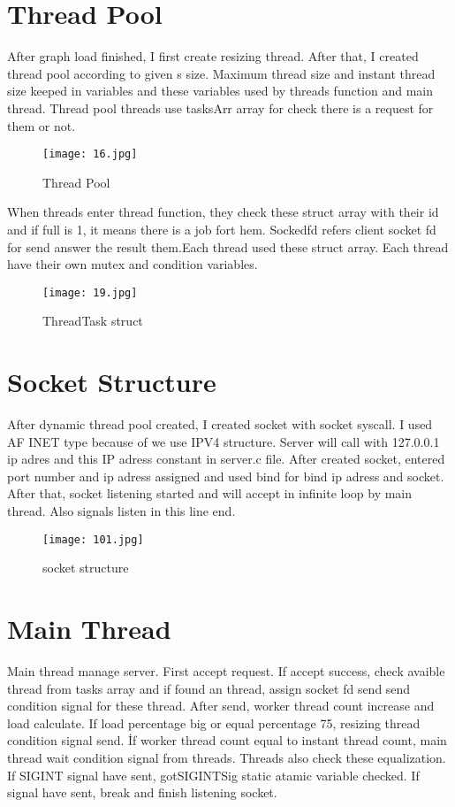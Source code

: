 \documentclass{article}
\begin{document}
\section{Thread Pool}
After graph load finished, I first create resizing thread. After that, I created thread pool according to given s size. Maximum thread size and instant thread size keeped in variables and these variables used by threads function and main thread. Thread pool threads use tasksArr array for check there is a request for them or not.
\newpage
\begin{figure}[h!] 
    \centering
    \texttt{[image: 16.jpg]}
    \caption{Thread Pool}
\end{figure}
When threads enter thread function, they check these struct array with their id and if full is 1, it means there is a job fort hem. Sockedfd refers client socket fd for send answer the result them.Each thread used these struct array. Each thread have their own mutex and condition variables.
\begin{figure}[h!] 
    \centering
    \texttt{[image: 19.jpg]}
    \caption{ThreadTask struct}
\end{figure}



\section{Socket Structure}
After dynamic thread pool created, I created socket with socket syscall. I used AF INET type because of we use IPV4 structure. Server will call with  127.0.0.1  ip adres and this IP adress constant in server.c file. After created socket, entered port number and ip adress assigned and  used bind for bind ip adress and socket.  After that, socket listening started and will accept in infinite loop by main thread. Also signals listen in this line end.
\begin{figure}[h!] 
    \centering
    \texttt{[image: 101.jpg]}
    \caption{socket structure}
\end{figure}

\section{Main Thread}
Main thread manage server. First accept request. If accept success, check avaible thread from tasks array and if found an thread, assign socket fd send send condition signal for these thread. After send, worker thread count increase and load calculate. If load percentage big or equal percentage 75, resizing thread condition signal send. İf worker thread count equal to instant thread count, main thread wait condition signal from threads. Threads also check these equalization.  If SIGINT signal have sent, 
gotSIGINTSig static atamic variable checked. If signal have sent, break and finish listening socket.
\end{document}
